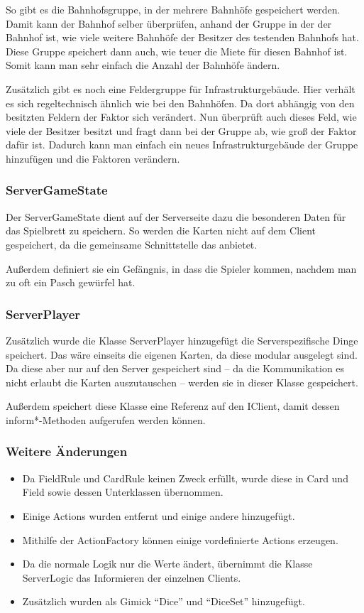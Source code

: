 \documentclass[a4paper,10pt]{article}
\begin{document}
So gibt es die Bahnhofsgruppe, in der mehrere Bahnhöfe gespeichert werden. Damit kann der Bahnhof selber überprüfen, anhand der Gruppe in der der Bahnhof ist, wie viele weitere Bahnhöfe der Besitzer des testenden Bahnhofs hat. Diese Gruppe speichert dann auch, wie teuer die Miete für diesen Bahnhof ist. Somit kann man sehr einfach die Anzahl der Bahnhöfe ändern.

Zusätzlich gibt es noch eine Feldergruppe für Infrastrukturgebäude. Hier verhält es sich regeltechnisch ähnlich wie bei den Bahnhöfen. Da dort abhängig von den besitzten Feldern der Faktor sich verändert. Nun überprüft auch dieses Feld, wie viele der Besitzer besitzt und fragt dann bei der Gruppe ab, wie groß der Faktor dafür ist. Dadurch kann man einfach ein neues Infrastrukturgebäude der Gruppe hinzufügen und die Faktoren verändern.
\subsubsection{ServerGameState}
Der ServerGameState dient auf der Serverseite dazu die besonderen Daten für das Spielbrett zu speichern. So werden die Karten nicht auf dem Client gespeichert, da die gemeinsame Schnittstelle das anbietet.

Außerdem definiert sie ein Gefängnis, in dass die Spieler kommen, nachdem man zu oft ein Pasch gewürfel hat.

\subsubsection{ServerPlayer}
Zusätzlich wurde die Klasse ServerPlayer hinzugefügt die Serverspezifische Dinge speichert. Das wäre einseits die eigenen Karten, da diese modular ausgelegt sind. Da diese aber nur auf den Server gespeichert sind -- da die Kommunikation es nicht erlaubt die Karten auszutauschen -- werden sie in dieser Klasse gespeichert.

Außerdem speichert diese Klasse eine Referenz auf den IClient, damit dessen inform*-Methoden aufgerufen werden können.

\subsubsection{Weitere Änderungen}
\begin{itemize}
\item Da FieldRule und CardRule keinen Zweck erfüllt, wurde diese in Card und Field sowie dessen Unterklassen übernommen.
\item Einige Actions wurden entfernt und einige andere hinzugefügt.
\item Mithilfe der ActionFactory können einige vordefinierte Actions erzeugen.
\item Da die normale Logik nur die Werte ändert, übernimmt die Klasse ServerLogic das Informieren der einzelnen Clients.
\item Zusätzlich wurden als Gimick ``Dice'' und ``DiceSet'' hinzugefügt.
\end{itemize}
\end{document}
